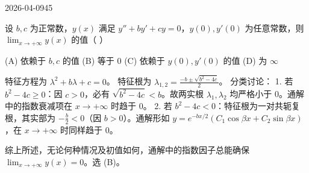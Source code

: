 \begin{mistake}{2026-04-09}{45}

\begin{problemcontent}
设 \( b, c \) 为正常数，\( y(x) \) 满足 \( y'' + by' + cy = 0 \)，\( y(0), y'(0) \) 为任意常数，则 \(\displaystyle \lim_{x \to +\infty} y(x)\) 的值（ ）

(A) 依赖于 \( b, c \) 的值 (B) 等于 0
(C) 依赖于 \( y(0), y'(0) \) 的值 (D) 为 \( \infty \)
\end{problemcontent}

\begin{solutioncontent}
特征方程为 \( \lambda^2 + b\lambda + c = 0 \)。
特征根为 \( \lambda_{1,2} = \frac{-b \pm \sqrt{b^2 - 4c}}{2} \)。
分类讨论：
1. 若 \( b^2 - 4c \geqslant 0 \)：因 \( c > 0 \)，必有 \( \sqrt{b^2 - 4c} < b \)。故两实根 \( \lambda_1, \lambda_2 \) 均严格小于 0。通解中的指数衰减项在 \( x \to +\infty \) 时趋于 0。
2. 若 \( b^2 - 4c < 0 \)：特征根为一对共轭复根，其实部为 \( -\frac{b}{2} < 0 \)（因 \( b > 0 \)）。通解形如 \( y = e^{-bx/2}(C_1\cos\beta x + C_2\sin\beta x) \)，在 \( x \to +\infty \) 时同样趋于 0。

综上所述，无论何种情况及初值如何，通解中的指数因子总能确保 \( \lim_{x \to +\infty} y(x) = 0 \)。选 (B)。
\end{solutioncontent}


\end{mistake}
